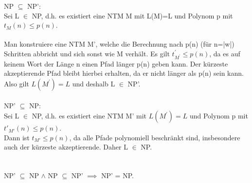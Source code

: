 NP $\subseteq$ NP':\\
Sei L $\in$ NP, d.h. es existiert eine NTM M mit L(M)=L und Polynom p mit $t_M(n) \leq p(n)$.\\ \ \\
Man konstruiere eine NTM M', welche die Berechnung nach p(n) (für n=|w|) Schritten abbricht und
sich sonst wie M verhält. Es gilt $t^\prime_{M^\prime} \leq p(n)$, da es auf keinem Wort der Länge n einen Pfad länger p(n)
geben kann. Der kürzeste akzeptierende Pfad bleibt hierbei erhalten, da er nicht länger als p(n) sein kann.
Also gilt $L(M^\prime)=L$ und deshalb L $\in$ NP'.
\\ \ \\
NP' $\subseteq$ NP:\\
Sei L $\in$ NP, d.h. es existiert eine NTM M' mit $L(M^\prime)=L$ und Polynom p mit $t'_{M'}(n) \leq p(n)$.\\
Dann ist $t_{M'} \leq p(n)$, da alle Pfade polynomiell beschränkt sind, insbesondere auch der kürzeste akzeptierende. Daher L $\in$ NP.\\
\\ \ \\
NP' $\subseteq$ NP $\land$ NP $\subseteq$ NP' $\implies$ NP' = NP.